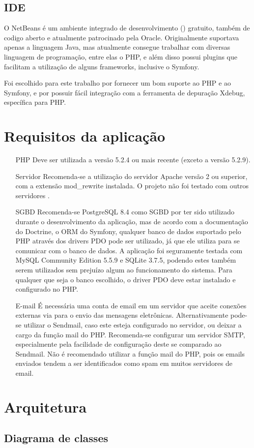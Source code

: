 \subsection{IDE}
O NetBeans é um ambiente integrado de desenvolvimento () gratuito, também de codigo aberto e 
atualmente patrocinado pela Oracle. Originalmente suportava apenas a linguagem Java, mas atualmente
consegue trabalhar com diversas linguagem de programação, entre elas o PHP, e além disso possui plugins
que facilitam a utilização de alguns frameworks, inclusive o Symfony.

Foi escolhido para este trabalho por fornecer um bom suporte ao PHP e ao Symfony, e por possuir fácil
integração com a ferramenta de depuração Xdebug, específica para PHP.

\section{Requisitos da aplicação}

\begin{itemize}
\item[PHP] Deve ser utilizada a versão 5.2.4 ou mais recente (exceto a versão 5.2.9).
\item[Servidor] Recomenda-se a utilização do servidor Apache versão 2 ou superior, com a extensão
mod\_rewrite instalada. O projeto não foi testado com outros servidores .
\item[SGBD] Recomenda-se PostgreSQL 8.4 como SGBD por ter sido utilizado durante o desenvolvimento da aplicação, mas
de acordo com a documentação do Doctrine, o ORM do Symfony, qualquer banco de dados suportado pelo PHP através 
dos drivers PDO pode ser utilizado, já que ele utiliza  para se comunicar com o banco de dados.
A aplicação foi seguramente testada com MySQL Community Edition 5.5.9 e SQLite 3.7.5, podendo estes 
também serem utilizados sem prejuízo algum ao funcionamento do sistema. Para qualquer que seja o
banco escolhido, o driver PDO deve estar instalado e configurado no PHP.
\item[E-mail] É necessária uma conta de email em um servidor que aceite conexões externas via  para
o envio das mensagens eletrônicas. Alternativamente pode-se utilizar o Sendmail, caso este esteja
configurado no servidor, ou deixar a cargo da função mail do PHP. Recomenda-se configurar um
servidor SMTP, especialmente pela facilidade de configura\-ção deste se comparado ao Sendmail. Não 
é recomendado utilizar a função mail do PHP, pois os emails enviados tendem a ser identificados
como spam em muitos servidores de email.
\end{itemize}

\section{Arquitetura}

\subsection{Diagrama de classes}


